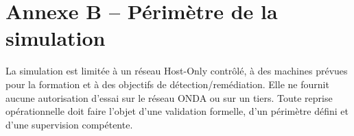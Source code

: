 \documentclass[12pt,a4paper,oneside]{report}
\begin{document}
\section*{Annexe B -- Périmètre de la simulation}
La simulation est limitée à un réseau Host-Only contrôlé, à des machines prévues pour la formation et à des objectifs de détection/remédiation. Elle ne fournit aucune autorisation d’essai sur le réseau ONDA ou sur un tiers. Toute reprise opérationnelle doit faire l’objet d’une validation formelle, d’un périmètre défini et d’une supervision compétente.
\end{document}
